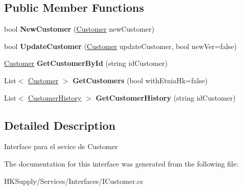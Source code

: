 \subsection*{Public Member Functions}
\begin{DoxyCompactItemize}
\item 
\mbox{\label{interface_h_k_supply_1_1_services_1_1_interfaces_1_1_i_customer_a4eae770f8e05c2a16b30d11ca2b6a3e8}} 
bool {\bfseries New\+Customer} (\mbox{\hyperlink{class_h_k_supply_1_1_models_1_1_customer}{Customer}} new\+Customer)
\item 
\mbox{\label{interface_h_k_supply_1_1_services_1_1_interfaces_1_1_i_customer_a2f446e665b10feef3e8373887a138048}} 
bool {\bfseries Update\+Customer} (\mbox{\hyperlink{class_h_k_supply_1_1_models_1_1_customer}{Customer}} update\+Customer, bool new\+Ver=false)
\item 
\mbox{\label{interface_h_k_supply_1_1_services_1_1_interfaces_1_1_i_customer_a0ce0dce4e042cf94014fbc1487bf7789}} 
\mbox{\hyperlink{class_h_k_supply_1_1_models_1_1_customer}{Customer}} {\bfseries Get\+Customer\+By\+Id} (string id\+Customer)
\item 
\mbox{\label{interface_h_k_supply_1_1_services_1_1_interfaces_1_1_i_customer_a38deeb756609f096eb6fcbd9561d2d97}} 
List$<$ \mbox{\hyperlink{class_h_k_supply_1_1_models_1_1_customer}{Customer}} $>$ {\bfseries Get\+Customers} (bool with\+Etnia\+Hk=false)
\item 
\mbox{\label{interface_h_k_supply_1_1_services_1_1_interfaces_1_1_i_customer_a2bfc5dd11d443814660429003b9db42c}} 
List$<$ \mbox{\hyperlink{class_h_k_supply_1_1_models_1_1_customer_history}{Customer\+History}} $>$ {\bfseries Get\+Customer\+History} (string id\+Customer)
\end{DoxyCompactItemize}


\subsection{Detailed Description}
Interface para el sevice de Customer 



The documentation for this interface was generated from the following file\+:\begin{DoxyCompactItemize}
\item 
H\+K\+Supply/\+Services/\+Interfaces/I\+Customer.\+cs\end{DoxyCompactItemize}
